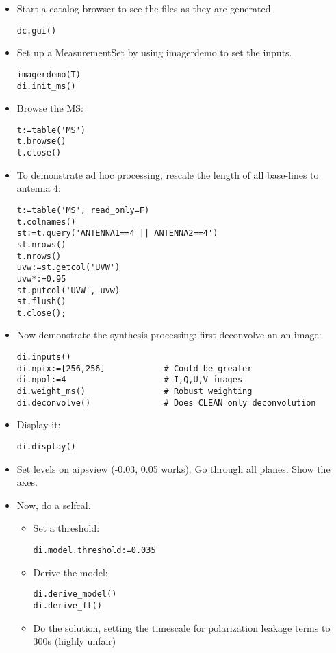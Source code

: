 \begin{itemize}
\item Start a catalog browser to see the files as they are generated
\begin{verbatim}
dc.gui()
\end{verbatim}
\item Set up a MeasurementSet by using imagerdemo to set the inputs.
\begin{verbatim}
imagerdemo(T)
di.init_ms()
\end{verbatim}
\item Browse the MS: 
\begin{verbatim}
t:=table('MS')
t.browse()
t.close()
\end{verbatim}
\item To demonstrate ad hoc processing, rescale the length
of all base-lines to antenna 4:
\begin{verbatim}
t:=table('MS', read_only=F)
t.colnames()
st:=t.query('ANTENNA1==4 || ANTENNA2==4')
st.nrows()
t.nrows()
uvw:=st.getcol('UVW')
uvw*:=0.95
st.putcol('UVW', uvw)
st.flush()
t.close();
\end{verbatim}
\item Now demonstrate the synthesis processing: first deconvolve an an image: 
\begin{verbatim}
di.inputs()
di.npix:=[256,256]            # Could be greater
di.npol:=4                    # I,Q,U,V images
di.weight_ms()                # Robust weighting
di.deconvolve()               # Does CLEAN only deconvolution
\end{verbatim}
\item Display it:
\begin{verbatim}
di.display()
\end{verbatim}
\item Set levels on aipsview (-0.03, 0.05 works). Go through all planes. Show the axes.
\item Now, do a selfcal.
\begin{itemize}
\item Set a threshold: 
\begin{verbatim}
di.model.threshold:=0.035
\end{verbatim}
\item Derive the model: 
\begin{verbatim}
di.derive_model()
di.derive_ft()
\end{verbatim}
\item Do the solution, setting the timescale for polarization leakage
terms to 300s (highly unfair)

\end{itemize}
\end{itemize}
